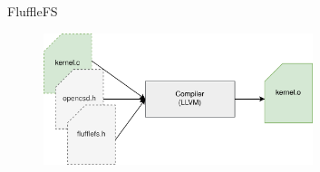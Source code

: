 \documentclass{beamer}
\begin{document}

\begin{frame}{FluffleFS}
	\begingroup
	\small %
	\begin{figure}
		\centering
		\includegraphics[width=0.7\textwidth]{resources/images/compile.png}
	\end{figure}
	\endgroup
\end{frame}
\end{document}
